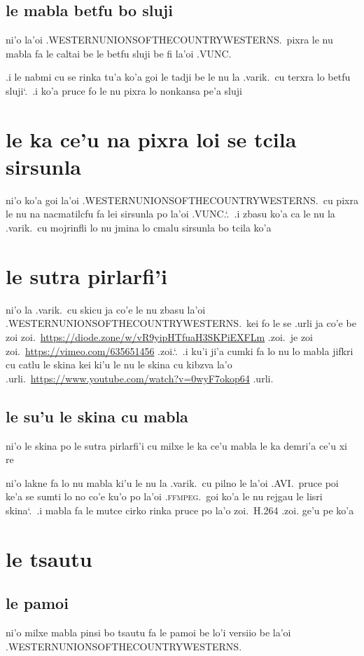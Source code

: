 \documentclass{report}
\newcommand\sds{\spacefactor\sfcode`.\ \space}
\begin{document}
\subsection{le mabla betfu bo sluji}
ni'o la'oi .WESTERNUNIONSOFTHECOUNTRYWESTERNS.\ pixra le nu mabla fa le caltai be le betfu sluji be fi la'oi .VUNC.

.i le nabmi cu se rinka tu'a ko'a goi le tadji be le nu la .varik.\ cu terxra lo betfu sluji\sds  .i ko'a pruce fo le nu pixra lo nonkansa pe'a sluji

\section{le ka ce'u na pixra loi se tcila sirsunla}
ni'o ko'a goi la'oi .WESTERNUNIONSOFTHECOUNTRYWESTERNS.\ cu pixra le nu na nacmatilcfu fa lei sirsunla po la'oi .VUNC.\sds  .i zbasu ko'a ca le nu la .varik.\ cu mojrinfli lo nu jmina lo cmalu sirsunla bo tcila ko'a

\section{le sutra pirlarfi'i}
ni'o la .varik.\ cu skicu ja co'e le nu zbasu la'oi .WESTERNUNIONSOFTHECOUNTRYWESTERNS.\ kei fo le se .urli ja co'e be zoi zoi.\ \url{https://diode.zone/w/vR9yipHTfuaH3SKPiEXFLm} .zoi.\ je zoi zoi.\ \url{https://vimeo.com/635651456} .zoi.\sds  .i ku'i ji'a cumki fa lo nu lo mabla jifkri cu catlu le skina kei ki'u le nu le skina cu kibzva la'o .urli.\ \url{https://www.youtube.com/watch?v=0wyF7okop64} .urli.

\subsection{le su'u le skina cu mabla}
ni'o le skina po le sutra pirlarfi'i cu milxe le ka ce'u mabla le ka demri'a ce'u xi re

ni'o lakne fa lo nu mabla ki'u le nu la .varik.\ cu pilno le la'oi .AVI.\ pruce poi ke'a se sumti lo no co'e ku'o po la'oi .\textsc{ffmpeg}.\ goi ko'a le nu rejgau le lisri skina\sds  .i mabla fa le mutce cirko rinka pruce po la'o zoi.\ H.264 .zoi. ge'u pe ko'a

\section{le tsautu}
\subsection{le pamoi}
ni'o milxe mabla pinsi bo tsautu fa le pamoi be lo'i versiio be la'oi .WESTERNUNIONSOFTHECOUNTRYWESTERNS.
\end{document}

